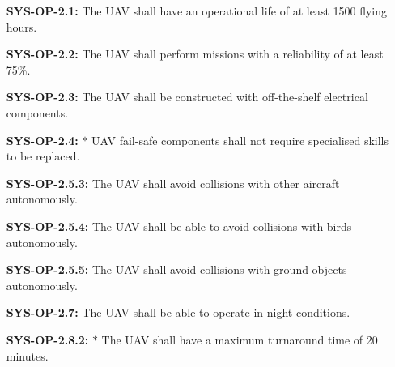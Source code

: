 \begin{enumerate}[leftmargin =4.5cm, align=parleft, labelwidth=10em]
    \item[\textbf{SYS-OP-2.1:}] The UAV shall have an operational life of at least 1500 flying hours.
    \item[\textbf{SYS-OP-2.2:}] The UAV shall perform missions with a reliability of at least 75\%.
    \item[\textbf{SYS-OP-2.3:} ] The UAV shall be constructed with off-the-shelf electrical components.
    \item[\textbf{SYS-OP-2.4:} $\ast$ ] UAV fail-safe components shall not require specialised skills to be replaced.
    \item[\textbf{SYS-OP-2.5.3:}] The UAV shall avoid collisions with other aircraft autonomously.
    \item[\textbf{SYS-OP-2.5.4:}] The UAV shall be able to avoid collisions with birds autonomously.
    \item[\textbf{SYS-OP-2.5.5:}] The UAV shall avoid collisions with ground objects autonomously.
    \item[\textbf{SYS-OP-2.7:}] The UAV shall be able to operate in night conditions.
    \item[\textbf{SYS-OP-2.8.2:} $\ast$ ] The UAV shall have a maximum turnaround time of 20 minutes.

\end{enumerate}
